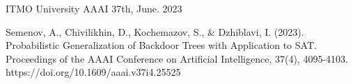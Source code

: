 
\begin{cventries}
  \cventry
    {ITMO University} %
    {} %
    {} %
    {AAAI 37th, June. 2023} %
    {
        \begin{cvitems}
            \item Semenov, A., Chivilikhin, D., Kochemazov, S., \& Dzhiblavi, I. (2023). Probabilistic Generalization of Backdoor Trees with Application to SAT. Proceedings of the AAAI Conference on Artificial Intelligence, 37(4), 4095-4103. https://doi.org/10.1609/aaai.v37i4.25525
        \end{cvitems}
    }
\end{cventries}
